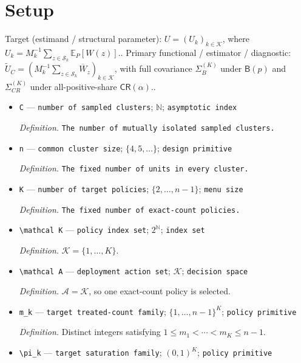 \documentclass{article}
\begin{document}
\section{Setup}

Target (estimand / structural parameter): \(U=(U_k)_{k\in\mathcal K}\), where \(U_k=M_k^{-1}\sum_{z\in\mathcal S_k}\mathbb E_P[W(z)]\)..
Primary functional / estimator / diagnostic: \(\widetilde U_C=(M_k^{-1}\sum_{z\in\mathcal S_k}\overline W_z)_{k\in\mathcal K}\), with full covariance \(\Sigma_B^{(K)}\) under \(\mathsf B(p)\) and \(\Sigma_{CR}^{(K)}\) under all-positive-share \(\mathsf{CR}(\alpha)\)..
\begin{itemize}
  \item \texttt{C} --- \texttt{number of sampled clusters}; \(\mathbb N\); \texttt{asymptotic index}
  \par\smallskip\noindent\emph{Definition.} \texttt{The number of mutually isolated sampled clusters.}
  \item \texttt{n} --- \texttt{common cluster size}; \(\{4,5,\ldots\}\); \texttt{design primitive}
  \par\smallskip\noindent\emph{Definition.} \texttt{The fixed number of units in every cluster.}
  \item \texttt{K} --- \texttt{number of target policies}; \(\{2,\ldots,n-1\}\); \texttt{menu size}
  \par\smallskip\noindent\emph{Definition.} \texttt{The fixed number of exact-\allowbreak{}count policies.}
  \item \texttt{\textbackslash{}\allowbreak{}mathcal K} --- \texttt{policy index set}; \(2^{\mathbb N}\); \texttt{index set}
  \par\smallskip\noindent\emph{Definition.} \(\mathcal K=\{1,\ldots,K\}\).
  \item \texttt{\textbackslash{}\allowbreak{}mathcal A} --- \texttt{deployment action set}; \(\mathcal K\); \texttt{decision space}
  \par\smallskip\noindent\emph{Definition.} \(\mathcal A=\mathcal K\), so one exact-count policy is selected.
  \item \texttt{m\_\allowbreak{}k} --- \texttt{target treated-\allowbreak{}count family}; \(\{1,\ldots,n-1\}^{K}\); \texttt{policy primitive}
  \par\smallskip\noindent\emph{Definition.} Distinct integers satisfying \(1\leq m_1<\cdots<m_K\leq n-1\).
  \item \texttt{\textbackslash{}\allowbreak{}pi\_\allowbreak{}k} --- \texttt{target saturation family}; \((0,1)^K\); \texttt{policy primitive}

\end{itemize}
\end{document}
